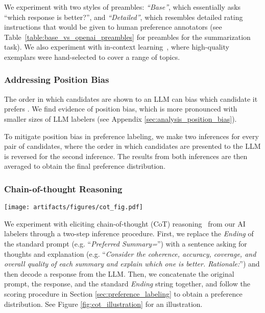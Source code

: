 \documentclass[11pt]{article}
\begin{document}
We experiment with two styles of preambles: \textit{``Base''}, which essentially asks ``which response is better?'', and \textit{``Detailed''}, which resembles detailed rating instructions that would be given to human preference annotators (see Table~\ref{table:base_vs_openai_preambles} for preambles for the summarization task). We also experiment with in-context learning~\citep{brown2020language}, where high-quality exemplars were hand-selected to cover a range of topics.


\subsubsection{Addressing Position Bias}
\label{sec:m_position_debiasing}

The order in which candidates are shown to an LLM can bias which candidate it prefers \citep{pezeshkpour2023large,wang2023large}. We find evidence of position bias, which is more pronounced with smaller sizes of LLM labelers (see Appendix \ref{sec:analysis_position_bias}).

To mitigate position bias in preference labeling, we make two inferences for every pair of candidates, where the order in which candidates are presented to the LLM is reversed for the second inference. The results from both inferences are then averaged to obtain the final preference distribution.


\subsubsection{Chain-of-thought Reasoning}
\label{sec:m_chain_of_thought}

\begin{figure*}[ht]
\texttt{[image: artifacts/figures/cot\_fig.pdf]}
\centering
\caption{An illustration of the process of obtaining AI-generated labels for summarization preferences. The LLM is first prompted to explain its thoughts on the quality of the two candidates (blue). The LLM's response is then appended to the original prompt (orange) and fed to the LLM a second time to generate a preference distribution over ``1'' vs. ``2'' based on their log-probabilities (green).}
\label{fig:cot_illustration}
\end{figure*}

We experiment with eliciting chain-of-thought (CoT) reasoning~\citep{wei2022chain} from our AI labelers through a two-step inference procedure. First, we replace the \textit{Ending} of the standard prompt (e.g. ``\textit{Preferred Summary=}'') with a sentence asking for thoughts and explanation (e.g. ``\textit{Consider the coherence, accuracy, coverage, and overall quality of each summary and explain which one is better. Rationale:}'') and then decode a response from the LLM. Then, we concatenate the original prompt, the response, and the standard \textit{Ending} string together, and follow the scoring procedure in Section \ref{sec:preference_labeling} to obtain a preference distribution. See Figure \ref{fig:cot_illustration} for an illustration.
\end{document}

